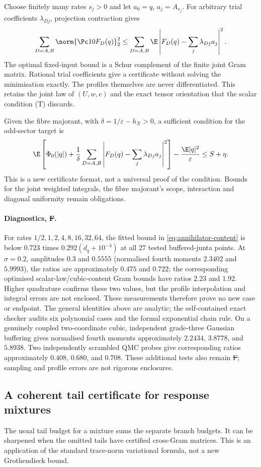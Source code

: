 Choose finitely many rates $s_j>0$ and let $a_0=q$, $a_j=A_{s_j}$.
For arbitrary trial coefficients $\lambda_{Dj}$, projection contraction gives
\begin{equation}\label{eq:annihilator-content}
\sum_{D=A,B}\norm{\Pc10F_D(q)}_2^2
\le\sum_{D=A,B}\E\left|F_D(q)-\sum_j\lambda_{Dj}a_j\right|^2.
\end{equation}
The optimal fixed-input bound is a Schur complement of the finite joint
Gram matrix. Rational trial coefficients give a certificate without solving
the minimisation exactly. The profiles themselves are never differentiated.
This retains the joint law of $(U,w,c)$ and the exact tensor orientation
that the scalar condition (T) discards.

Given the fibre majorant, with $\delta=1/\varepsilon-h_X>0$, a sufficient
condition for the odd-sector target is
\[
\E\left[\Phi_0(|q|)+\frac1\delta\sum_{D=A,B}
\left|F_D(q)-\sum_j\lambda_{Dj}a_j\right|^2\right]
-\frac{\E|q|^2}{\varepsilon}\le S+\eta.
\]
This is a new certificate format, not a universal proof of the condition.
Bounds for the joint weighted integrals, the fibre majorant's scope,
interaction and diagonal uniformity remain obligations.

\paragraph{Diagnostics, \st{F}.}
For rates $1/2,1,2,4,8,16,32,64$, the fitted bound in
\eqref{eq:annihilator-content} is below $0.723$ times
$0.292(d_q+10^{-4})$ at all 27 tested buffered-junta points.
At $\sigma=0.2$, amplitudes $0.3$ and $0.5555$ (normalised fourth moments
$2.3402$ and $5.9993$), the ratios are approximately $0.475$ and $0.722$;
the corresponding optimised scalar-law/cubic-content Gram bounds have
ratios $2.23$ and $1.92$. Higher quadrature confirms these two values,
but the profile interpolation and integral errors are not enclosed.
These measurements therefore prove no new case or endpoint.
The general identities above are analytic; the self-contained exact checker
audits six polynomial cases and the formal exponential chain rule.
On a genuinely coupled two-coordinate cubic, independent grade-three
Gaussian buffering gives normalised fourth moments approximately
$2.2434$, $3.8778$, and $5.8938$. Two independently scrambled QMC probes
give corresponding ratios approximately $0.408$, $0.680$, and $0.708$.
These additional tests also remain \st{F}; sampling and profile errors
are not rigorous enclosures.

\subsection{A coherent tail certificate for response mixtures}
\label{sec:coherent-pool-tail}
The usual tail budget for a mixture sums the separate branch budgets.
It can be sharpened when the omitted tails have certified cross-Gram
matrices. This is an application of the standard trace-norm variational
formula, not a new Grothendieck bound.

